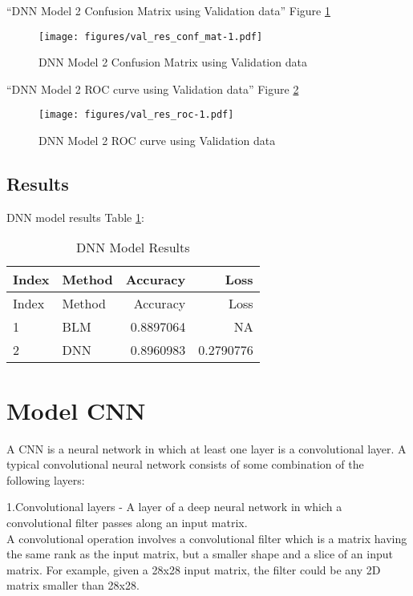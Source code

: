 \documentclass[
]{article}
\begin{document}
``DNN Model 2 Confusion Matrix using Validation data'' Figure
\ref{fig:model_12}

\begin{figure}
\centering
\texttt{[image: figures/val\_res\_conf\_mat-1.pdf]}
\caption{DNN Model 2 Confusion Matrix using Validation
data\label{fig:model_12}}
\end{figure}

``DNN Model 2 ROC curve using Validation data'' Figure
\ref{fig:model_13}

\begin{figure}
\centering
\texttt{[image: figures/val\_res\_roc-1.pdf]}
\caption{DNN Model 2 ROC curve using Validation
data\label{fig:model_13}}
\end{figure}

\newpage

\hypertarget{results-1}{%
\subsection{Results}\label{results-1}}

DNN model results Table \ref{tbl:dnn_results_table}:

\begin{longtable}[]{@{}llrr@{}}
\caption{DNN Model Results\label{tbl:dnn_results_table}}\tabularnewline
\toprule
Index & Method & Accuracy & Loss \\
\midrule
\endfirsthead
\toprule
Index & Method & Accuracy & Loss \\
\midrule
\endhead
1 & BLM & 0.8897064 & NA \\
2 & DNN & 0.8960983 & 0.2790776 \\
\bottomrule
\end{longtable}

\newpage

\hypertarget{model-cnn}{%
\section{Model CNN}\label{model-cnn}}

A CNN is a neural network in which at least one layer is a convolutional
layer. A typical convolutional neural network consists of some
combination of the following layers:

1.Convolutional layers - A layer of a deep neural network in which a
convolutional filter passes along an input matrix.\\
A convolutional operation involves a convolutional filter which is a
matrix having the same rank as the input matrix, but a smaller shape and
a slice of an input matrix. For example, given a 28x28 input matrix, the
filter could be any 2D matrix smaller than 28x28.
\end{document}
